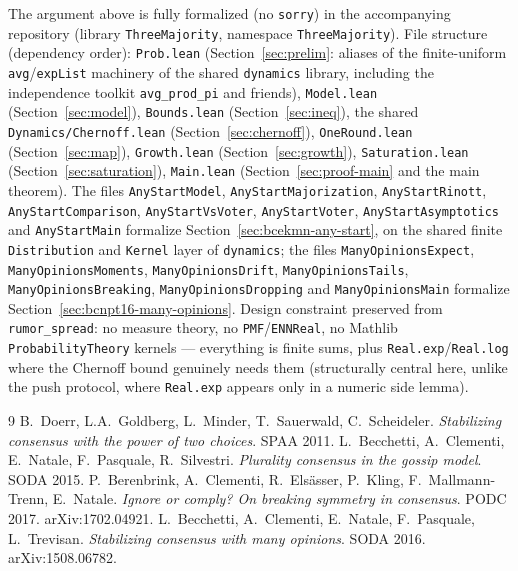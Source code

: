 The argument above is fully formalized (no \texttt{sorry}) in the
accompanying repository (library \texttt{ThreeMajority}, namespace
\texttt{ThreeMajority}). File structure (dependency order):
\texttt{Prob.lean} (Section~\ref{sec:prelim}: aliases of the finite-uniform
\texttt{avg}/\texttt{expList} machinery of the shared \texttt{dynamics}
library, including the independence toolkit \texttt{avg\_prod\_pi} and
friends), \texttt{Model.lean}
(Section~\ref{sec:model}), \texttt{Bounds.lean} (Section~\ref{sec:ineq}),
the shared \texttt{Dynamics/Chernoff.lean} (Section~\ref{sec:chernoff}),
\texttt{OneRound.lean}
(Section~\ref{sec:map}), \texttt{Growth.lean} (Section~\ref{sec:growth}),
\texttt{Saturation.lean} (Section~\ref{sec:saturation}), \texttt{Main.lean}
(Section~\ref{sec:proof-main} and the main theorem). The files
\texttt{AnyStartModel}, \texttt{AnyStartMajorization}, \texttt{AnyStartRinott},
\texttt{AnyStartComparison}, \texttt{AnyStartVsVoter}, \texttt{AnyStartVoter},
\texttt{AnyStartAsymptotics} and \texttt{AnyStartMain} formalize
Section~\ref{sec:bcekmn-any-start}, on the shared finite \texttt{Distribution} and
\texttt{Kernel} layer of \texttt{dynamics}; the files \texttt{ManyOpinionsExpect},
\texttt{ManyOpinionsMoments}, \texttt{ManyOpinionsDrift}, \texttt{ManyOpinionsTails},
\texttt{ManyOpinionsBreaking}, \texttt{ManyOpinionsDropping} and \texttt{ManyOpinionsMain}
formalize Section~\ref{sec:bcnpt16-many-opinions}. Design constraint
preserved from \texttt{rumor\_spread}: no measure theory, no
\texttt{PMF}/\texttt{ENNReal}, no Mathlib \texttt{ProbabilityTheory}
kernels --- everything is finite sums, plus \texttt{Real.exp}/\texttt{Real.log}
where the Chernoff bound genuinely needs them (structurally central here,
unlike the push protocol, where \texttt{Real.exp} appears only in a numeric
side lemma).

\begin{thebibliography}{9}
 B.~Doerr, L.A.~Goldberg, L.~Minder, T.~Sauerwald,
C.~Scheideler. \emph{Stabilizing consensus with the power of two choices}.
SPAA 2011.
 L.~Becchetti, A.~Clementi, E.~Natale, F.~Pasquale,
R.~Silvestri. \emph{Plurality consensus in the gossip model}. SODA 2015.
 P.~Berenbrink, A.~Clementi, R.~Elsässer, P.~Kling,
F.~Mallmann-Trenn, E.~Natale. \emph{Ignore or comply? On breaking symmetry in consensus}.
PODC 2017. arXiv:1702.04921.
 L.~Becchetti, A.~Clementi, E.~Natale, F.~Pasquale, L.~Trevisan.
\emph{Stabilizing consensus with many opinions}. SODA 2016. arXiv:1508.06782.
\end{thebibliography}



